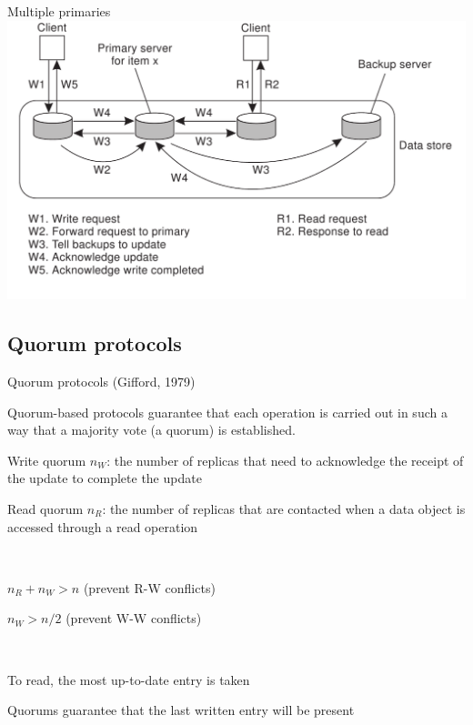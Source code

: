 \begin{frame}{Multiple primaries}
\includegraphics[width=\textwidth]{figs/09/multipleprimary}
\end{frame}

\subsection{Quorum protocols}

\begin{frame}{Quorum protocols (Gifford, 1979)}
	
\begin{definition}
Quorum-based protocols guarantee that each operation is carried out in such
a way that a majority vote (a quorum) is established.
\BI
\item \alert{Write quorum} $n_W$: the number of replicas that need to acknowledge the receipt of the update to complete the update
\item \alert{Read quorum} $n_R$: the number of replicas that are contacted when a data object is accessed through a read operation
\EI
\end{definition}

\smallskip
{}\\
\BI
\item $n_R + n_W > n$ (prevent R-W conflicts)
\item $n_W > n/2$	  (prevent W-W conflicts)
\EI

\smallskip
{}\\
\BI
\item To read, the most up-to-date entry is taken
\item Quorums guarantee that the last written entry will be present
\EI

\end{frame}

